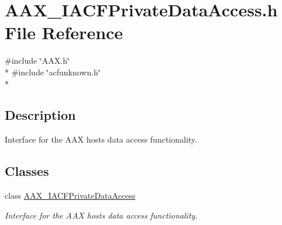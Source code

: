 \hypertarget{a00231}{}\section{A\+A\+X\+\_\+\+I\+A\+C\+F\+Private\+Data\+Access.\+h File Reference}
\label{a00231}
{\ttfamily \#include \char`\"{}A\+A\+X.\+h\char`\"{}}\\*
{\ttfamily \#include \char`\"{}acfunknown.\+h\char`\"{}}\\*


\subsection{Description}
Interface for the A\+A\+X host\textquotesingle{}s data access functionality. 

\subsection*{Classes}
\begin{DoxyCompactItemize}
\item 
class \hyperlink{a00078}{A\+A\+X\+\_\+\+I\+A\+C\+F\+Private\+Data\+Access}
\begin{DoxyCompactList}\small\item\em Interface for the A\+A\+X host\textquotesingle{}s data access functionality. \end{DoxyCompactList}\end{DoxyCompactItemize}
